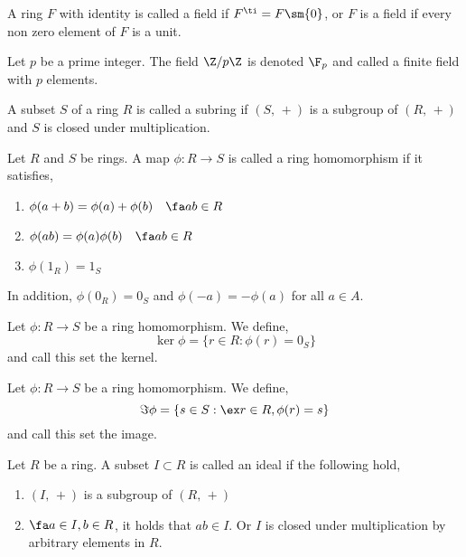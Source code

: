 \documentclass{article}
\begin{document}
\begin{ndefi}[Field]
  A ring $F$ with identity is called a field if $F^\ti = F \sm \{0\}$, or $F$ is a field if every non zero element of $F$ is a unit.
\end{ndefi}

\begin{ndefi}
  Let $p$ be a prime integer. The field $\Z/p\Z$ is denoted $\F_p$ and called a finite field with $p$ elements.
\end{ndefi}

\begin{ndefi}[Subring]
  A subset $S$ of a ring $R$ is called a subring if $(S,\,+)$ is a subgroup of $(R,\,+)$ and $S$ is closed under multiplication.
\end{ndefi}

\begin{ndefi}
  Let $R$ and $S$ be rings. A map $\phi : R \to S$ is called a ring homomorphism if it satisfies,
  \begin{enumerate}
    \item $\phi(a + b) = \phi(a) + \phi(b)\quad\fa a b \in R$
    \item $\phi(ab) = \phi(a)\phi(b)\quad\fa a b \in R$
    \item $\phi(1_R) = 1_S$
  \end{enumerate}
  In addition, $\phi(0_R) = 0_S$ and $\phi(-a) = -\phi(a)$ for all $a \in A$.
\end{ndefi}

\begin{ndefi}[Kernel]
  Let $\phi : R \to S$ be a ring homomorphism. We define,
  $$ \ker \phi = \{r \in R : \phi(r) = 0_S\} $$
  and call this set the kernel.
\end{ndefi}

\begin{ndefi}[Image]
  Let $\phi : R \to S$ be a ring homomorphism. We define,
  $$ \Im \phi = \{s \in S : \ex r \in R, \phi(r) = s\} $$
  and call this set the image.
\end{ndefi}

\begin{ndefi}[Ideal]
  Let $R$ be a ring. A subset $I \subset R$ is called an ideal if the following hold,
  \begin{enumerate}
    \item $(I,\,+)$ is a subgroup of $(R,\,+)$
    \item $\fa a \in I, b \in R$, it holds that $ab \in I$. Or $I$ is closed under multiplication by arbitrary elements in $R$.
  \end{enumerate}
\end{ndefi}
\end{document}
